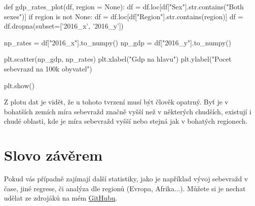 \documentclass[12pt]{article}
\begin{document}
\begin{python}
def gdp_rates_plot(df, region = None):
    df = df.loc[df["Sex"].str.contains("Both sexes")]
    if region is not None:
        df = df.loc[df["Region"].str.contains(region)]
    df = df.dropna(subset=['2016_x', '2016_y'])
  
    np_rates = df["2016_x"].to_numpy()
    np_gdp = df["2016_y"].to_numpy()

    plt.scatter(np_gdp, np_rates)
    plt.xlabel("Gdp na hlavu")
    plt.ylabel("Pocet sebevrazd na 100k obyvatel")

    plt.show()
\end{python}

Z plotu dat je vidět, že u tohoto tvrzení musí být člověk opatrný. Byť je v bohatších zemích míra sebevražd značně vyšší než v některých chudších, existují i chudé oblasti, kde je míra sebevražd vyšší nebo stejná jak v bohatých regionech.

\section{Slovo závěrem}
Pokud vás případně zajímají další statistiky, jako je například vývoj sebevražd v čase, jiné regrese, či analýza dle regionů (Evropa, Afrika...). Můžete si je nechat udělat ze zdrojáků na mém \href{https://github.com/Desperadus/PaST-Zapoctak}{GitHubu}.

\renewcommand\refname{Reference} 


\end{document}
